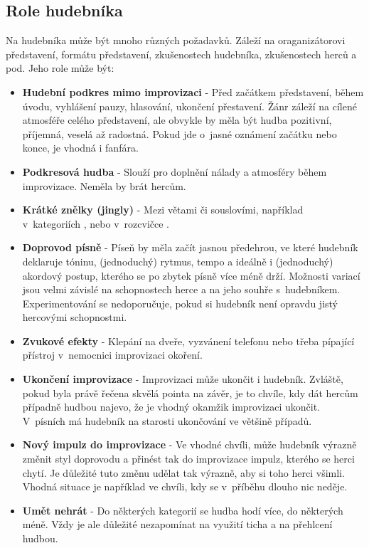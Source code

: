 \subsection{Role hudebníka} Na hudebníka může být mnoho různých požadavků. Záleží na oraganizátorovi představení, formátu představení, zkušenostech hudebníka,  zkušenostech herců a pod. Jeho role může být: 
\begin{itemize}
\item \textbf{Hudební podkres mimo improvizaci} - Před začátkem představení, během úvodu, vyhlášení pauzy, hlasování, ukončení přestavení. Žánr záleží na cílené atmosféře celého představení, ale obvykle by měla být hudba pozitivní, příjemná, veselá až radostná. Pokud jde o~jasné oznámení začátku nebo konce, je vhodná i fanfára.
\item \textbf{Podkresová hudba} - Slouží pro doplnění nálady a atmosféry během improvizace. Neměla by brát  hercům.
\item \textbf{Krátké znělky (jingly)} - Mezi větami či souslovími, například v~kategoriích ,  nebo v~rozcvičce .
\item \textbf{Doprovod písně} - Píseň by měla začít jasnou předehrou, ve které hudebník deklaruje tóninu, (jednoduchý) rytmus, tempo a ideálně i (jednoduchý) akordový postup, kterého se po zbytek písně více méně drží. Možnosti variací jsou velmi závislé na schopnostech herce a na jeho souhře s~hudebníkem. Experimentování se nedoporučuje, pokud si hudebník není opravdu jistý hercovými schopnostmi.
\item \textbf{Zvukové efekty} - Klepání na dveře, vyzvánení telefonu nebo třeba pípající přístroj v~nemocnici improvizaci okoření.
\item \textbf{Ukončení improvizace} - Improvizaci může ukončit i hudebník. Zvláště, pokud byla právě řečena skvělá pointa na závěr, je to chvíle, kdy dát hercům případně  hudbou najevo, že je vhodný okamžik improvizaci ukončit. V~písních má hudebník na starosti ukončování ve většině případů.
\item \textbf{Nový impulz do improvizace} - Ve vhodné chvíli, může hudebník výrazně změnit styl doprovodu a přinést tak do improvizace impulz, kterého se herci chytí. Je důležité tuto změnu udělat tak výrazně, aby si toho herci všimli. Vhodná situace je například ve chvíli, kdy se v~příběhu dlouho nic neděje.
\item \textbf{Umět nehrát} - Do některých kategorií se hudba hodí více, do některých méně. Vždy je ale důležité nezapomínat na využití ticha a na přehlcení hudbou.
\end{itemize}
 

